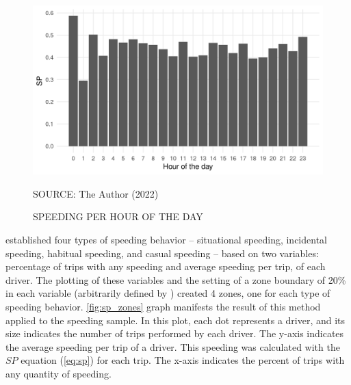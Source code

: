 \begin{figure}[!htbp]
    \centering\footnotesize
    \captionsetup{font=footnotesize}
    \caption{SPEEDING PER HOUR OF THE DAY}
    \includegraphics{fig/hotd_sp.png}
    \label{fig:hotd_sp}
    \par SOURCE: The Author (2022)
\end{figure}


\textcite{Richard2013a} established four types of speeding behavior – situational speeding, incidental speeding, habitual speeding, and casual speeding – based on two variables: percentage of trips with any speeding and average speeding per trip, of each driver. The plotting of these variables and the setting of a zone boundary of 20\% in each variable (arbitrarily defined by \textcite{Richard2013a}) created 4 zones, one for each type of speeding behavior. \autoref{fig:sp_zones} graph manifests the result of this method applied to the speeding sample. In this plot, each dot represents a driver, and its size indicates the number of trips performed by each driver. The y-axis indicates the average speeding per trip of a driver. This speeding was calculated with the $SP$ equation (\ref{eq:sp}) for each trip. The x-axis indicates the percent of trips with any quantity of speeding.

